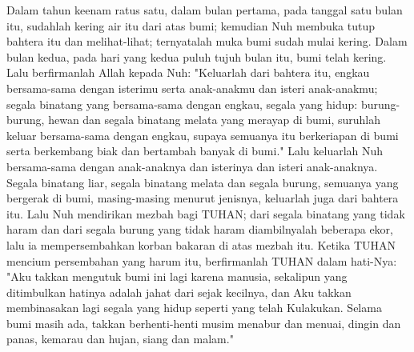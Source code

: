 \begin{biblechapter}
\verse Dalam tahun keenam ratus satu, dalam bulan pertama, pada tanggal satu bulan itu, sudahlah kering air itu dari atas bumi; kemudian Nuh membuka tutup bahtera itu dan melihat-lihat; ternyatalah muka bumi sudah mulai kering.
\verse Dalam bulan kedua, pada hari yang kedua puluh tujuh bulan itu, bumi telah kering.
\verse Lalu berfirmanlah Allah kepada Nuh:
\verse "Keluarlah dari bahtera itu, engkau bersama-sama dengan isterimu serta anak-anakmu dan isteri anak-anakmu;
\verse segala binatang yang bersama-sama dengan engkau, segala yang hidup: burung-burung, hewan dan segala binatang melata yang merayap di bumi, suruhlah keluar bersama-sama dengan engkau, supaya semuanya itu berkeriapan di bumi serta berkembang biak dan bertambah banyak di bumi."
\verse Lalu keluarlah Nuh bersama-sama dengan anak-anaknya dan isterinya dan isteri anak-anaknya.
\verse Segala binatang liar, segala binatang melata dan segala burung, semuanya yang bergerak di bumi, masing-masing menurut jenisnya, keluarlah juga dari bahtera itu.
\verse Lalu Nuh mendirikan mezbah bagi TUHAN; dari segala binatang yang tidak haram dan dari segala burung yang tidak haram diambilnyalah beberapa ekor, lalu ia mempersembahkan korban bakaran di atas mezbah itu.
\verse Ketika TUHAN mencium persembahan yang harum itu, berfirmanlah TUHAN dalam hati-Nya: "Aku takkan mengutuk bumi ini lagi karena manusia, sekalipun yang ditimbulkan hatinya adalah jahat dari sejak kecilnya, dan Aku takkan membinasakan lagi segala yang hidup seperti yang telah Kulakukan.
\verse Selama bumi masih ada, takkan berhenti-henti musim menabur dan menuai, dingin dan panas, kemarau dan hujan, siang dan malam."
\end{biblechapter}

